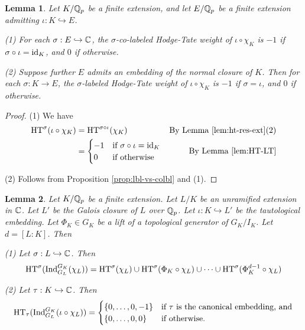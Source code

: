 \documentclass[10pt,a4paper,twoside]{article}
\newtheorem{lem}{Lemma}
\begin{document}
\begin{appendix}
\begin{lem}
\label{lem:ht-lubin-tate}
Let $K/\mathbb{Q}_p$ be a finite extension, and let $E/\mathbb{Q}_p$ be a finite extension admitting $\iota: K \hookrightarrow E$.

(1)
For each $\sigma:E\hookrightarrow {\mathbb{C}}$,
the $\sigma$-co-labeled Hodge-Tate weight
of $\iota\circ \chi_K$ is $-1$ if
$\sigma\circ \iota = \operatorname{id}_K$, and $0$ if otherwise.

(2)
Suppose further $E$ admits an embedding
of the normal closure of $K$.
Then for each $\sigma:K\to E$,
the $\sigma$-labeled Hodge-Tate weight of $\iota\circ \chi_K$ is $-1$ if
$\sigma=\iota$, and $0$ if otherwise.
\end{lem}

\begin{proof}
(1) We have
\begin{align*}
{\operatorname{HT}}^{\sigma}(\iota\circ\chi_K) &
={\operatorname{HT}}^{\sigma\circ \iota}(\chi_K) & \text{By Lemma \ref{lem:ht-res-ext}(2)} \\
&=
\begin{cases}
 -1 & \text{if $\sigma\circ\iota=\operatorname{id}_K$}\\
 0 & \text{if otherwise}
\end{cases}
&\text{By Lemma \ref{lem:HT-LT}}
\end{align*}

(2)
Follows from Proposition \ref{prop:lbl-vs-colbl} and (1).
\end{proof}



\begin{lem}
\label{lem:ind-calc}
Let $K/\mathbb{Q}_p$ be a finite extension.
Let $L/K$ be an unramified extension in ${\mathbb{C}}$.
Let $L'$ be the Galois closure of $L$
over $\mathbb{Q}_p$.
Let $\iota:K\hookrightarrow L'$ be the tautological embedding.
Let $\Phi_K\in G_K$ be a lift of a topological generator of $G_K/I_K$.
Let $d = [L:K]$.
Then 

(1)
Let $\sigma: L \hookrightarrow {\mathbb{C}}$. Then
$$
{\operatorname{HT}}^{\sigma}(\operatorname{Ind}_{G_L}^{G_K} (\chi_L)) = 
{\operatorname{HT}}^{\sigma}(\chi_L) \cup {\operatorname{HT}}^{\sigma}(\Phi_K\circ \chi_L) \cup \dots \cup {\operatorname{HT}}^{\sigma}(\Phi_K^{d-1}\circ\chi_L)
$$

(2)
Let $\tau: K\hookrightarrow {\mathbb{C}}$. Then
$$
{\operatorname{HT}}_{\tau}(\operatorname{Ind}_{G_L}^{G_K}(\iota\circ \chi_L)) = 
\begin{cases}
\{0, \dots, 0, -1\}& \text{if }\tau\text{ is the canonical embedding, and}\\
\{0, \dots, 0, 0\} &\text{if otherwise.}
\end{cases}
$$
\end{lem}


\end{appendix}
\end{document}
